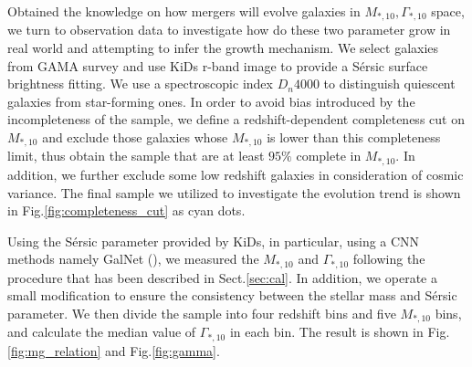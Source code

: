 \documentclass[fleqn,usenatbib]{mnras}
\begin{document}
\par Obtained the knowledge on how mergers will evolve galaxies in $M_{*,10}, \Gamma_{*,10}$ space, we turn to observation data to investigate how do these two parameter grow in real world and attempting to infer the growth mechanism. We select galaxies from GAMA survey and use KiDs r-band image to provide a S\'{e}rsic surface brightness fitting. We use a spectroscopic index $D_n 4000$ to distinguish quiescent galaxies from star-forming ones. In order to avoid bias introduced by the incompleteness of the sample, we define a redshift-dependent completeness cut on $M_{*,10}$ and exclude those galaxies whose $M_{*,10}$ is lower than this completeness limit, thus obtain the sample that are at least $95\%$ complete in $M_{*,10}$. In addition, we further exclude some low redshift galaxies in consideration of cosmic variance. The final sample we utilized to investigate the evolution trend is shown in Fig.\ref{fig:completeness_cut} as cyan dots.
\par Using the S\'{e}rsic parameter provided by KiDs, in particular, using a CNN methods namely GalNet (\cite{GaLNet2022}), we measured the $M_{*,10}$ and $\Gamma_{*,10}$ following the procedure that has been described in Sect.\ref{sec:cal}. In addition, we operate a small modification to ensure the consistency between the stellar mass and S\'{e}rsic parameter. We then divide the sample into four redshift bins and five $M_{*,10}$ bins, and calculate the median value of $\Gamma_{*,10}$ in each bin. The result is shown in Fig.\ref{fig:mg_relation} and Fig.\ref{fig:gamma}.



\end{document}
